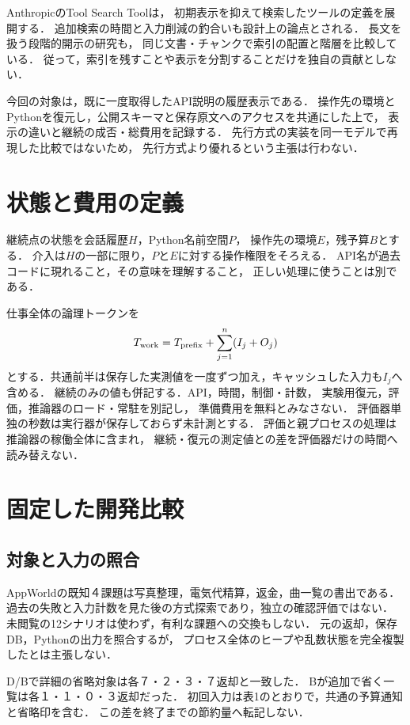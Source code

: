 \documentclass[uplatex,a4paper,twocolumn,10pt]{jsarticle}
\begin{document}
AnthropicのTool Search Tool\cite{toolsearch}は，
初期表示を抑えて検索したツールの定義を展開する．
追加検索の時間と入力削減の釣合いも設計上の論点とされる．
長文を扱う段階的開示の研究\cite{disclosure}も，
同じ文書・チャンクで索引の配置と階層を比較している．
従って，索引を残すことや表示を分割することだけを独自の貢献としない．

今回の対象は，既に一度取得したAPI説明の履歴表示である．
操作先の環境とPythonを復元し，公開スキーマと保存原文へのアクセスを共通にした上で，
表示の違いと継続の成否・総費用を記録する．
先行方式の実装を同一モデルで再現した比較ではないため，
先行方式より優れるという主張は行わない．

\section{状態と費用の定義}
継続点の状態を会話履歴$H$，Python名前空間$P$，
操作先の環境$E$，残予算$B$とする．
介入は$H$の一部に限り，$P$と$E$に対する操作権限をそろえる．
API名が過去コードに現れること，その意味を理解すること，
正しい処理に使うことは別である．

仕事全体の論理トークンを
\begin{equation}
 T_{\rm work}=T_{\rm prefix}+\sum_{j=1}^{n}(I_j+O_j)
\end{equation}
とする．共通前半は保存した実測値を一度ずつ加え，キャッシュした入力も$I_j$へ含める．
継続のみの値も併記する．API，時間，制御・計数，
実験用復元，評価，推論器のロード・常駐を別記し，
準備費用を無料とみなさない．
評価器単独の秒数は実行器が保存しておらず未計測とする．
評価と親プロセスの処理は推論器の稼働全体に含まれ，
継続・復元の測定値との差を評価器だけの時間へ読み替えない．

\section{固定した開発比較}


\subsection{対象と入力の照合}
AppWorld\cite{appworld}の既知４課題は写真整理，電気代精算，返金，曲一覧の書出である．
過去の失敗と入力計数を見た後の方式探索であり，独立の確認評価ではない．
未閲覧の12シナリオは使わず，有利な課題への交換もしない．
元の返却，保存DB，Pythonの出力を照合するが，
プロセス全体のヒープや乱数状態を完全複製したとは主張しない．

D/Bで詳細の省略対象は各７・２・３・７返却と一致した．
Bが追加で省く一覧は各１・１・０・３返却だった．
初回入力は表1のとおりで，共通の予算通知と省略印を含む．
この差を終了までの節約量へ転記しない．
\end{document}
